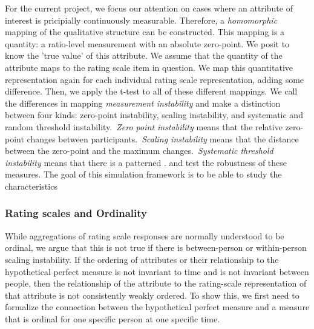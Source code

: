 \documentclass[utf8]{FrontiersinVancouver}
\begin{document}
For the current project, we focus our attention on cases where an attribute of interest is pricipially continuously measurable. Therefore, a \textit{homomorphic} mapping of the qualitative structure can be constructed. This mapping is a quantity: a ratio-level measurement with an absolute zero-point. We posit to know the 'true value' of this attribute. We assume that the quantity of the attribute maps to the rating scale item in question. We map this quantitative representation again for each individual rating scale representation, adding some difference. Then, we apply the t-test to all of these different mappings. We call the differences in mapping \textit{measurement instability} and make a distinction between four kinds: zero-point instability, scaling instability, and systematic and random threshold instability.\ \textit{Zero point instability} means that the relative zero-point changes between participants.\ \textit{Scaling instability} means that the distance between the zero-point and the maximum changes.\ \textit{Systematic threshold instability} means that there is a patterned . and test the robustness of these measures. The goal of this simulation framework is to be able to study the characteristics

\subsubsection{Rating scales and Ordinality}
While aggregations of rating scale responses are normally understood to be ordinal, we argue that this is not true if there is between-person or within-person scaling instability. If the ordering of attributes or their relationship to the hypothetical perfect measure is not invariant to time and is not invariant between people, then the relationship of the attribute to the rating-scale representation of that attribute is not consistently weakly ordered. To show this, we first need to formalize the connection between the hypothetical perfect measure and a measure that is ordinal for one specific person at one specific time.
\end{document}
